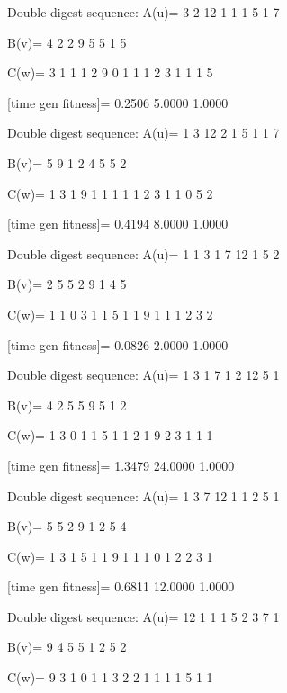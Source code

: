 Double digest sequence:
A(u)=
     3     2    12     1     1     1     5     1     7

B(v)=
     4     2     2     9     5     5     1     5

C(w)=
     3     1     1     1     2     9     0     1     1     1     2     3     1     1     1     5

[time gen fitness]=
    0.2506    5.0000    1.0000

Double digest sequence:
A(u)=
     1     3    12     2     1     5     1     1     7

B(v)=
     5     9     1     2     4     5     5     2

C(w)=
     1     3     1     9     1     1     1     1     1     2     3     1     1     0     5     2

[time gen fitness]=
    0.4194    8.0000    1.0000

Double digest sequence:
A(u)=
     1     1     3     1     7    12     1     5     2

B(v)=
     2     5     5     2     9     1     4     5

C(w)=
     1     1     0     3     1     1     5     1     1     9     1     1     1     2     3     2

[time gen fitness]=
    0.0826    2.0000    1.0000

Double digest sequence:
A(u)=
     1     3     1     7     1     2    12     5     1

B(v)=
     4     2     5     5     9     5     1     2

C(w)=
     1     3     0     1     1     5     1     1     2     1     9     2     3     1     1     1

[time gen fitness]=
    1.3479   24.0000    1.0000

Double digest sequence:
A(u)=
     1     3     7    12     1     1     2     5     1

B(v)=
     5     5     2     9     1     2     5     4

C(w)=
     1     3     1     5     1     1     9     1     1     1     0     1     2     2     3     1

[time gen fitness]=
    0.6811   12.0000    1.0000

Double digest sequence:
A(u)=
    12     1     1     1     5     2     3     7     1

B(v)=
     9     4     5     5     1     2     5     2

C(w)=
     9     3     1     0     1     1     3     2     2     1     1     1     1     5     1     1

